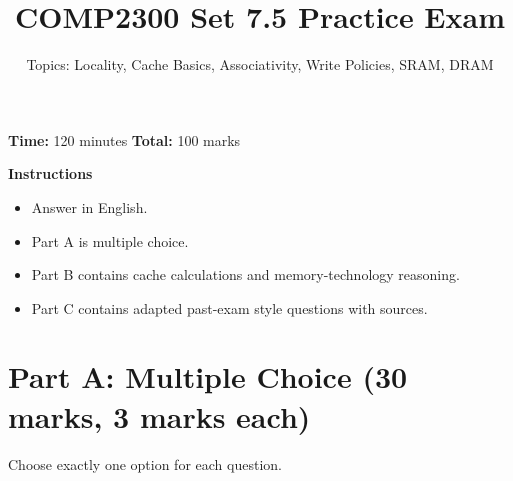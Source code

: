 \documentclass[11pt]{article}
\title{COMP2300 Set 7.5 Practice Exam}
\author{Topics: Locality, Cache Basics, Associativity, Write Policies, SRAM, DRAM}
\date{}
\begin{document}
\maketitle

\noindent\textbf{Time:} 120 minutes \hfill
\textbf{Total:} 100 marks

\vspace{0.5em}
\noindent\textbf{Instructions}
\begin{itemize}[leftmargin=1.5em]
  \item Answer in English.
  \item Part A is multiple choice.
  \item Part B contains cache calculations and memory-technology reasoning.
  \item Part C contains adapted past-exam style questions with sources.
\end{itemize}

\section*{Part A: Multiple Choice (30 marks, 3 marks each)}
Choose exactly one option for each question.
\end{document}

